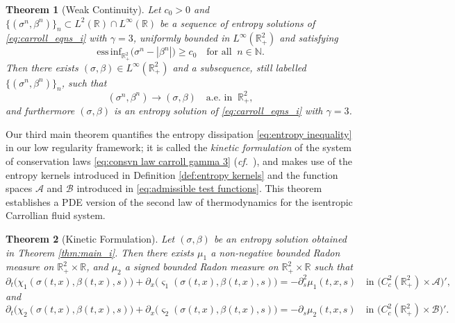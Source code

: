 \documentclass[11pt,a4paper,reqno]{amsart}
\numberwithin{equation}{section}
\newtheorem{theorem}{Theorem}[section]
\theoremstyle{definition}
\theoremstyle{remark}
\newcommand{\essinf}{\mathrm{ess \, inf}}
\renewcommand{\geq}{\geqslant}
\begin{document}
{\begin{theorem}[Weak Continuity]\label{thm:main_ii}
    Let $c_0>0$ and $\{(\sigma^n,\beta^n)\}_n \subset L^2(\mathbb{R}) \cap L^\infty(\mathbb{R})$ be a sequence of entropy solutions of \eqref{eq:carroll_eqns_i} with $\gamma=3$, uniformly bounded in $L^\infty(\mathbb{R}^2_+)$ and satisfying 
    \begin{equation}\label{eq:ic essinf second}
           \essinf_{\mathbb{R}^2_+} \big( \sigma^n - |\beta^n| \big) \geq c_0 \quad \text{for all }\ n \in \mathbb{N}. 
        \end{equation}
        Then there exists $(\sigma,\beta) \in L^\infty(\mathbb{R}^2_+)$ and a subsequence, still labelled $\{(\sigma^n,\beta^n)\}_n$, such that 
        \begin{equation*}
            (\sigma^n,\beta^n) \longrightarrow (\sigma,\beta) \quad \text{a.e.~in }\ \mathbb{R}^2_+, 
        \end{equation*}
        and furthermore $(\sigma,\beta)$ is an entropy solution of \eqref{eq:carroll_eqns_i} with $\gamma=3$. 
\end{theorem}





Our third main theorem quantifies the entropy dissipation \eqref{eq:entropy inequality} in our low regularity framework; it is called the \emph{kinetic formulation} of the system of conservation laws \eqref{eq:consvn law carroll gamma 3} (\textit{cf.}~\cite{PerthameBook}), and makes use of the entropy kernels introduced in Definition \ref{def:entropy kernels} and the function spaces $\mathcal{A}$ and $\mathcal{B}$ introduced in \eqref{eq:admissible test functions}. This theorem establishes a PDE version of the second law of thermodynamics for the isentropic Carrollian fluid system.



\begin{theorem}[Kinetic Formulation]\label{thm:main_iii}
    Let $(\sigma,\beta)$ be an entropy solution obtained in Theorem \ref{thm:main_i}. Then there exists $\mu_1$ a non-negative bounded Radon measure on $\mathbb{R}^2_+\times\mathbb{R}$, and $\mu_2$ a signed bounded Radon measure on $\mathbb{R}^2_+\times\mathbb{R}$ such that 
    \begin{equation}\label{eq:kinetic formulation 1}
        \partial_t \big(\chi_1(\sigma(t,x),\beta(t,x),s)\big) + \partial_x \big(\varsigma_1(\sigma(t,x),\beta(t,x),s)\big) = -\partial^2_s \mu_1(t,x,s) \quad \text{in } \big( C^2_c(\mathbb{R}^2_+)\times\mathcal{A} \big)', 
    \end{equation}
    and 
    \begin{equation}\label{eq:kinetic formulation 2}
        \partial_t \big(\chi_2(\sigma(t,x),\beta(t,x),s)\big) + \partial_x \big(\varsigma_2(\sigma(t,x),\beta(t,x),s)\big) = -\partial_s \mu_2(t,x,s) \quad \text{in } \big( C^2_c(\mathbb{R}^2_+)\times\mathcal{B} \big)'. 
        \end{equation}
\end{theorem}


}
\end{document}
